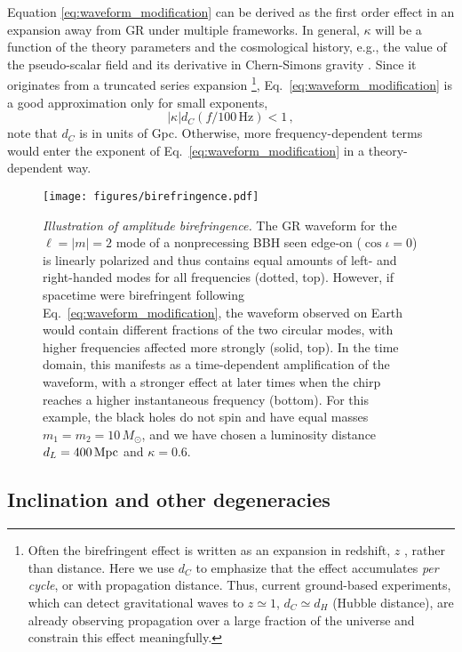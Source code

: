 \documentclass[aps,prd,twocolumn,superscriptaddress,preprintnumbers,nofootinbib]{revtex4-2}
\begin{document}
Equation \eqref{eq:waveform_modification} can be derived as the first order effect in an expansion away from \ac{GR} under multiple frameworks.
In general, $\kappa$ will be a function of the theory parameters and the cosmological history, e.g., the value of the pseudo-scalar field and its derivative in Chern-Simons gravity \cite{Alexander:2009tp}.
Since it originates from a truncated series expansion%
\footnote{Often the birefringent effect is written as an expansion in redshift, $z$ \cite[e.g.][]{Zhao:2019xmm}, rather than distance.  Here we use $d_C$ to emphasize that the effect accumulates \emph{per cycle}, or with propagation distance.  Thus, current ground-based experiments, which can detect gravitational waves to $z \simeq 1$, $d_C \simeq d_H$ (Hubble distance), are already observing propagation over a large fraction of the universe and constrain this effect meaningfully.}, %
Eq.~\eqref{eq:waveform_modification} is a good approximation only for small exponents, 
\begin{equation}
\left|\kappa\right| d_C \left(f/100\, \mathrm{Hz}\right) < 1\,,
\end{equation}
note that $d_C$ is in units of Gpc.
Otherwise, more frequency-dependent terms would enter the exponent of Eq.~\eqref{eq:waveform_modification} in a theory-dependent way.

\begin{figure}
    \texttt{[image: figures/birefringence.pdf]}
    \caption{
        \emph{Illustration of amplitude birefringence.} The GR waveform for the $\ell=|m|=2$ mode of a nonprecessing BBH seen edge-on ($\cos\iota = 0$) is linearly polarized and thus contains equal amounts of left- and right-handed modes for all frequencies (dotted, top).
        However, if spacetime were birefringent following Eq.~\protect\eqref{eq:waveform_modification}, the waveform observed on Earth would contain different fractions of the two circular modes, with higher frequencies affected more strongly (solid, top). 
        In the time domain, this manifests as a time-dependent amplification of the waveform, with a stronger effect at later times when the chirp reaches a higher instantaneous frequency (bottom).
        For this example, the black holes do not spin and have equal masses $m_1 = m_2 = 10\, M_\odot$, and we have chosen a luminosity distance $d_L = 400\, {\rm Mpc}$ and $\kappa = 0.6$.
        }
    \label{fig:birefringence}
\end{figure}

\subsection{Inclination and other degeneracies}
\label{sec:inclination}
\end{document}
